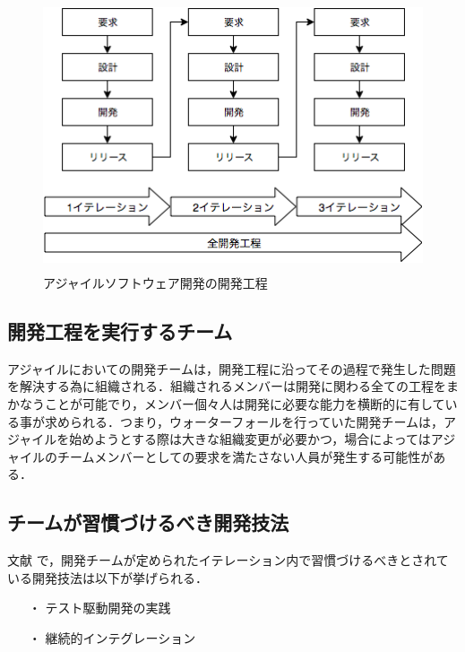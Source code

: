 \begin{figure}[H]
\centering
\includegraphics[height=8cm]{./assets/images/agile.png}
\caption{アジャイルソフトウェア開発の開発工程}
\label{fig:agile}
\end{figure}


\subsection{開発工程を実行するチーム}

アジャイルにおいての開発チームは，開発工程に沿ってその過程で発生した問題を解決する為に組織される．組織されるメンバーは開発に関わる全ての工程をまかなうことが可能でり，メンバー個々人は開発に必要な能力を横断的に有している事が求められる．つまり，ウォーターフォールを行っていた開発チームは，アジャイルを始めようとする際は大きな組織変更が必要かつ，場合によってはアジャイルのチームメンバーとしての要求を満たさない人員が発生する可能性がある．

\subsection{チームが習慣づけるべき開発技法}


文献 \cite{西村直人2011アジャイルサムライ}で，開発チームが定められたイテレーション内で習慣づけるべきとされている開発技法は以下が挙げられる．

\begin{itemize}
 \item[・]テスト駆動開発の実践
 \item[・]継続的インテグレーション
\end{itemize}

